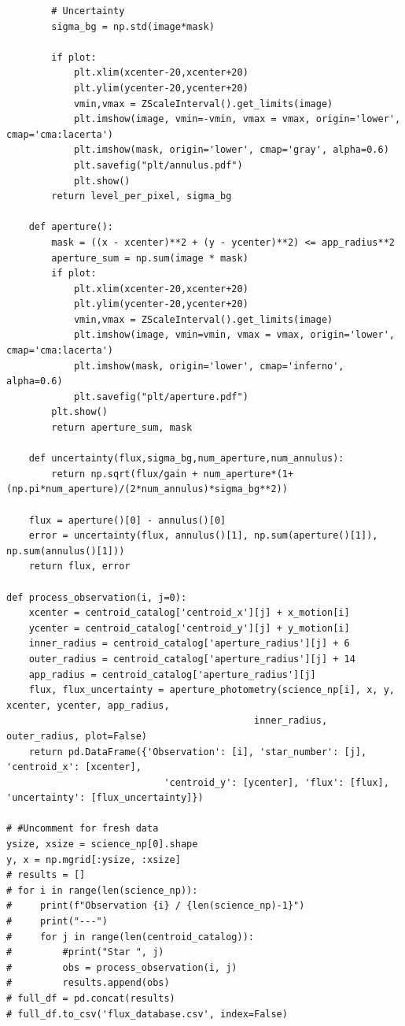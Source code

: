 \documentclass{article}
\begin{document}
\begin{appendices}
\begin{scriptsize}
\begin{verbatim}
        # Uncertainty
        sigma_bg = np.std(image*mask)

        if plot:
            plt.xlim(xcenter-20,xcenter+20)
            plt.ylim(ycenter-20,ycenter+20)
            vmin,vmax = ZScaleInterval().get_limits(image)
            plt.imshow(image, vmin=-vmin, vmax = vmax, origin='lower', cmap='cma:lacerta')
            plt.imshow(mask, origin='lower', cmap='gray', alpha=0.6)
            plt.savefig("plt/annulus.pdf")
            plt.show()
        return level_per_pixel, sigma_bg
    
    def aperture():
        mask = ((x - xcenter)**2 + (y - ycenter)**2) <= app_radius**2
        aperture_sum = np.sum(image * mask)
        if plot:
            plt.xlim(xcenter-20,xcenter+20)
            plt.ylim(ycenter-20,ycenter+20)
            vmin,vmax = ZScaleInterval().get_limits(image)
            plt.imshow(image, vmin=vmin, vmax = vmax, origin='lower', cmap='cma:lacerta')
            plt.imshow(mask, origin='lower', cmap='inferno', alpha=0.6)
            plt.savefig("plt/aperture.pdf")
        plt.show()
        return aperture_sum, mask
    
    def uncertainty(flux,sigma_bg,num_aperture,num_annulus):
        return np.sqrt(flux/gain + num_aperture*(1+(np.pi*num_aperture)/(2*num_annulus)*sigma_bg**2))

    flux = aperture()[0] - annulus()[0]
    error = uncertainty(flux, annulus()[1], np.sum(aperture()[1]), np.sum(annulus()[1]))
    return flux, error

def process_observation(i, j=0):
    xcenter = centroid_catalog['centroid_x'][j] + x_motion[i]
    ycenter = centroid_catalog['centroid_y'][j] + y_motion[i]
    inner_radius = centroid_catalog['aperture_radius'][j] + 6
    outer_radius = centroid_catalog['aperture_radius'][j] + 14
    app_radius = centroid_catalog['aperture_radius'][j]
    flux, flux_uncertainty = aperture_photometry(science_np[i], x, y, xcenter, ycenter, app_radius, 
                                            inner_radius, outer_radius, plot=False)
    return pd.DataFrame({'Observation': [i], 'star_number': [j], 'centroid_x': [xcenter], 
                            'centroid_y': [ycenter], 'flux': [flux], 'uncertainty': [flux_uncertainty]})

# #Uncomment for fresh data
ysize, xsize = science_np[0].shape
y, x = np.mgrid[:ysize, :xsize]
# results = []
# for i in range(len(science_np)):
#     print(f"Observation {i} / {len(science_np)-1}")
#     print("---")
#     for j in range(len(centroid_catalog)):
#         #print("Star ", j)
#         obs = process_observation(i, j)
#         results.append(obs)
# full_df = pd.concat(results)
# full_df.to_csv('flux_database.csv', index=False)


\end{verbatim}
\end{scriptsize}
\end{appendices}
\end{document}
